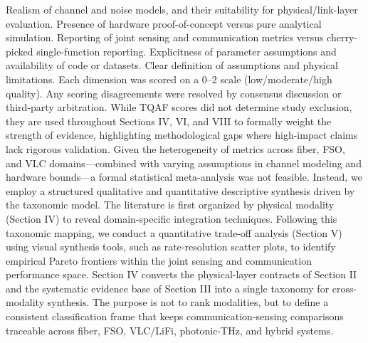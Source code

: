 {}\markdownRendererOlBeginTight
{} Realism of channel and noise models, and their suitability for physical/link-layer evaluation.\markdownRendererOlItemEnd 
{} Presence of hardware proof-of-concept versus pure analytical simulation.\markdownRendererOlItemEnd 
{} Reporting of joint sensing and communication metrics versus cherry-picked single-function reporting.\markdownRendererOlItemEnd 
{} Explicitness of parameter assumptions and availability of code or datasets.\markdownRendererOlItemEnd 
{} Clear definition of assumptions and physical limitations.\markdownRendererOlItemEnd 
\markdownRendererOlEndTight \markdownRendererInterblockSeparator
{}Each dimension was scored on a 0–2 scale (low/moderate/high quality). Any scoring disagreements were resolved by consensus discussion or third-party arbitration. While TQAF scores did not determine study exclusion, they are used throughout Sections IV, VI, and VIII to formally weight the strength of evidence, highlighting methodological gaps where high-impact claims lack rigorous validation.\markdownRendererInterblockSeparator
{}
\markdownRendererSectionEnd \markdownRendererSectionBegin
{}\markdownRendererInterblockSeparator
{}Given the heterogeneity of metrics across fiber, FSO, and VLC domains—combined with varying assumptions in channel modeling and hardware bounds—a formal statistical meta-analysis was not feasible. Instead, we employ a structured qualitative and quantitative descriptive synthesis driven by the taxonomic model. The literature is first organized by physical modality (Section IV) to reveal domain-specific integration techniques. Following this taxonomic mapping, we conduct a quantitative trade-off analysis (Section V) using visual synthesis tools, such as rate-resolution scatter plots, to identify empirical Pareto frontiers within the joint sensing and communication performance space.\markdownRendererParagraphSeparator
{}
\markdownRendererSectionEnd 
\markdownRendererSectionEnd \markdownRendererSectionBegin
{}\markdownRendererInterblockSeparator
{}Section IV converts the physical-layer contracts of Section II and the systematic evidence base of Section III into a single taxonomy for cross-modality synthesis. The purpose is not to rank modalities, but to define a consistent classification frame that keeps communication-sensing comparisons traceable across fiber, FSO, VLC/LiFi, photonic-THz, and hybrid systems.\markdownRendererInterblockSeparator
